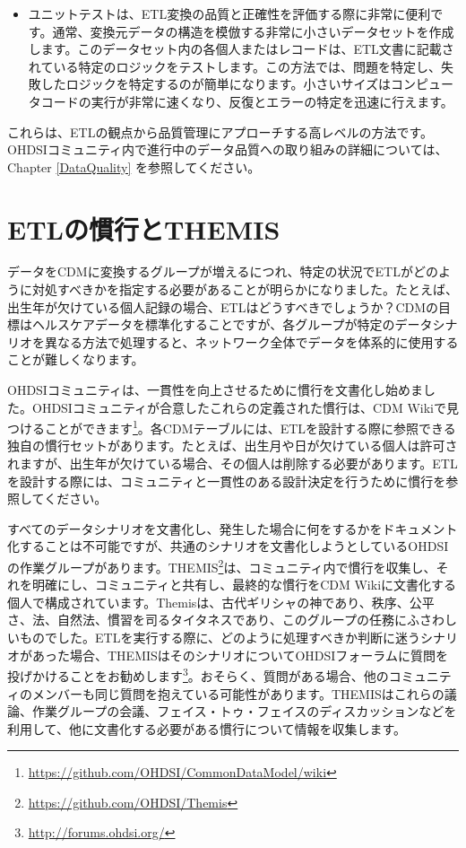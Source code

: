 \documentclass[
  11pt]{book}
\providecommand{\tightlist}{%
  \setlength{\itemsep}{0pt}\setlength{\parskip}{0pt}}
\theoremstyle{definition}
\theoremstyle{definition}
\theoremstyle{definition}
\theoremstyle{definition}
\theoremstyle{remark}
\begin{document}
\begin{itemize}
  \begin{itemize}
  \tightlist
  \item
    ユニットテストは、ETL変換の品質と正確性を評価する際に非常に便利です。通常、変換元データの構造を模倣する非常に小さいデータセットを作成します。このデータセット内の各個人またはレコードは、ETL文書に記載されている特定のロジックをテストします。この方法では、問題を特定し、失敗したロジックを特定するのが簡単になります。小さいサイズはコンピュータコードの実行が非常に速くなり、反復とエラーの特定を迅速に行えます。
  \end{itemize}
\end{itemize}

これらは、ETLの観点から品質管理にアプローチする高レベルの方法です。OHDSIコミュニティ内で進行中のデータ品質への取り組みの詳細については、Chapter \ref{DataQuality} を参照してください。

\section{ETLの慣行とTHEMIS}\label{etlux306eux6163ux884cux3068themis}

データをCDMに変換するグループが増えるにつれ、特定の状況でETLがどのように対処すべきかを指定する必要があることが明らかになりました。たとえば、出生年が欠けている個人記録の場合、ETLはどうすべきでしょうか？CDMの目標はヘルスケアデータを標準化することですが、各グループが特定のデータシナリオを異なる方法で処理すると、ネットワーク全体でデータを体系的に使用することが難しくなります。

OHDSIコミュニティは、一貫性を向上させるために慣行を文書化し始めました。OHDSIコミュニティが合意したこれらの定義された慣行は、CDM Wikiで見つけることができます\footnote{\url{https://github.com/OHDSI/CommonDataModel/wiki}}。各CDMテーブルには、ETLを設計する際に参照できる独自の慣行セットがあります。たとえば、出生月や日が欠けている個人は許可されますが、出生年が欠けている場合、その個人は削除する必要があります。ETLを設計する際には、コミュニティと一貫性のある設計決定を行うために慣行を参照してください。

すべてのデータシナリオを文書化し、発生した場合に何をするかをドキュメント化することは不可能ですが、共通のシナリオを文書化しようとしているOHDSIの作業グループがあります。THEMIS\footnote{\url{https://github.com/OHDSI/Themis}}は、コミュニティ内で慣行を収集し、それを明確にし、コミュニティと共有し、最終的な慣行をCDM Wikiに文書化する個人で構成されています。Themisは、古代ギリシャの神であり、秩序、公平さ、法、自然法、慣習を司るタイタネスであり、このグループの任務にふさわしいものでした。ETLを実行する際に、どのように処理すべきか判断に迷うシナリオがあった場合、THEMISはそのシナリオについてOHDSIフォーラムに質問を投げかけることをお勧めします\footnote{\url{http://forums.ohdsi.org/}}。おそらく、質問がある場合、他のコミュニティのメンバーも同じ質問を抱えている可能性があります。THEMISはこれらの議論、作業グループの会議、フェイス・トゥ・フェイスのディスカッションなどを利用して、他に文書化する必要がある慣行について情報を収集します。
\end{document}
